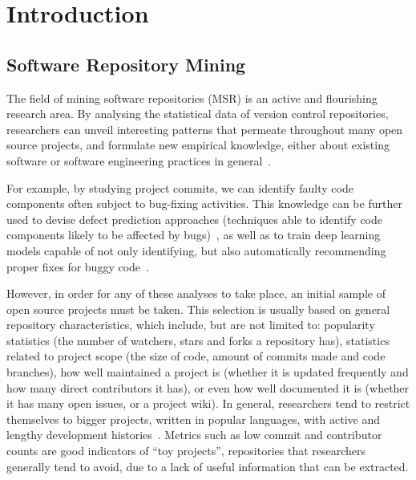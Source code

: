 \chapter{Introduction}

\section{Software Repository Mining}

The field of mining software repositories (MSR) is an active and flourishing research area.
By analysing the statistical data of version control repositories, researchers can unveil interesting patterns that permeate throughout many open source projects, and formulate new empirical knowledge, either about existing software or software engineering practices in general~\cite{MSR}.

For example, by studying project commits, we can identify faulty code components often subject to bug-fixing activities.
This knowledge can be further used to devise defect prediction approaches (techniques able to identify code components likely to be affected by bugs)~\cite{DEFECT1,DEFECT2}, as well as to train deep learning models capable of not only identifying, but also automatically recommending proper fixes for buggy code~\cite{BUGFIX}.

However, in order for any of these analyses to take place, an initial sample of open source projects must be taken.
This selection is usually based on general repository characteristics, which include, but are not limited to: popularity statistics (the number of watchers, stars and forks a repository has), statistics related to project scope (the size of code, amount of commits made and code branches), how well maintained a project is (whether it is updated frequently and how many direct contributors it has), or even how well documented it is (whether it has many open issues, or a project wiki).
In general, researchers tend to restrict themselves to bigger projects, written in popular languages, with active and lengthy development histories~\cite{PDSSE}.
Metrics such as low commit and contributor counts are good indicators of ``toy projects'', repositories that researchers generally tend to avoid, due to a lack of useful information that can be extracted.

